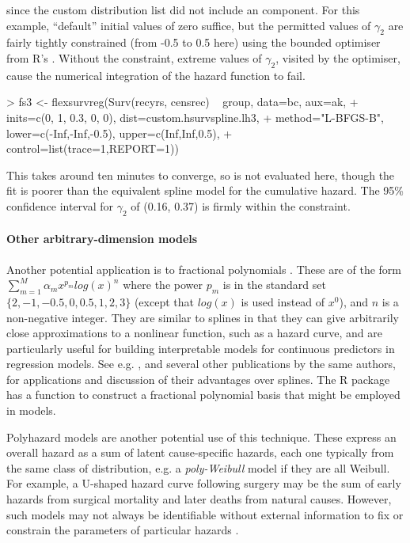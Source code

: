\documentclass[nojss,nofooter]{jss}
\begin{document}
since the custom distribution list did not include an 
component.  For this example, ``default'' initial values of zero
suffice, but the permitted values of $\gamma_2$ are fairly tightly
constrained (from -0.5 to 0.5 here) using the 
bounded optimiser from R's  \citep{nash}.  Without the
constraint, extreme values of $\gamma_2$, visited by the optimiser,
cause the numerical integration of the hazard function to fail.
\begin{Schunk}
\begin{Sinput}
> fs3 <- flexsurvreg(Surv(recyrs, censrec) ~ group, data=bc, aux=ak,
+                    inits=c(0, 1, 0.3, 0, 0), dist=custom.hsurvspline.lh3, 
+                    method="L-BFGS-B", lower=c(-Inf,-Inf,-0.5), upper=c(Inf,Inf,0.5),
+                    control=list(trace=1,REPORT=1))
\end{Sinput}
\end{Schunk}
This takes around ten minutes to converge, so is not evaluated here,
though the fit is poorer than the equivalent spline model for the
cumulative hazard.  The 95\% confidence interval for $\gamma_2$ of
(0.16, 0.37) is firmly within the constraint.

\paragraph{Other arbitrary-dimension models}

Another potential application is to fractional polynomials
\citep{royston1994regression}. These are of the form $\sum_{m=1}^M
\alpha_m x^{p_m} log(x)^n$ where the power $p_m$ is in the standard
set $\{2,-1,-0.5,0,0.5,1,2,3\}$ (except that $log(x)$ is used instead
of $x^0$), and $n$ is a non-negative integer. They are similar to
splines in that they can give arbitrarily close approximations to a
nonlinear function, such as a hazard curve, and are particularly
useful for building interpretable models for continuous predictors in
regression models.  See e.g. \citet{sauerbrei2007selection}, and
several other publications by the same authors, for applications and
discussion of their advantages over splines.  The R package
 \citep{gamlss} has a function to construct a fractional
polynomial basis that might be employed in  models.

Polyhazard models \citep{polyhazard} are another potential use of this
technique.  These express an overall hazard as a sum of latent
cause-specific hazards, each one typically from the same class of
distribution, e.g. a \emph{poly-Weibull} model if they are all
Weibull.  For example, a U-shaped hazard curve following surgery may
be the sum of early hazards from surgical mortality and later deaths
from natural causes.  However, such models may not always be
identifiable without external information to fix or constrain the
parameters of particular hazards \citep{demiris2011survival}.
\end{document}
